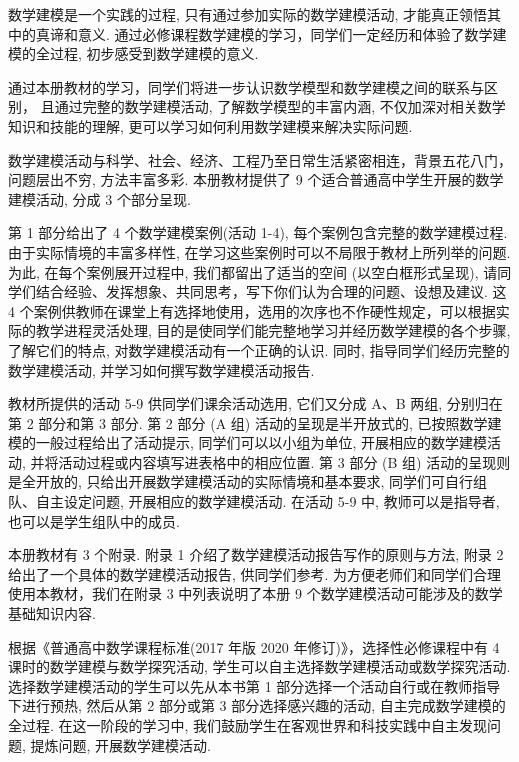 \documentclass[10pt]{article}
\begin{document}
数学建模是一个实践的过程, 只有通过参加实际的数学建模活动, 才能真正领悟其中的真谛和意义. 通过必修课程数学建模的学习，同学们一定经历和体验了数学建模的全过程, 初步感受到数学建模的意义.

通过本册教材的学习，同学们将进一步认识数学模型和数学建模之间的联系与区别， 且通过完整的数学建模活动, 了解数学模型的丰富内涵, 不仅加深对相关数学知识和技能的理解, 更可以学习如何利用数学建模来解决实际问题.

数学建模活动与科学、社会、经济、工程乃至日常生活紧密相连，背景五花八门，问题层出不穷, 方法丰富多彩. 本册教材提供了 9 个适合普通高中学生开展的数学建模活动, 分成 3 个部分呈现.

第 1 部分给出了 4 个数学建模案例(活动 1-4), 每个案例包含完整的数学建模过程. 由于实际情境的丰富多样性, 在学习这些案例时可以不局限于教材上所列举的问题. 为此, 在每个案例展开过程中, 我们都留出了适当的空间 (以空白框形式呈现), 请同学们结合经验、发挥想象、共同思考，写下你们认为合理的问题、设想及建议. 这 4 个案例供教师在课堂上有选择地使用，选用的次序也不作硬性规定，可以根据实际的教学进程灵活处理, 目的是使同学们能完整地学习并经历数学建模的各个步骤, 了解它们的特点, 对数学建模活动有一个正确的认识. 同时, 指导同学们经历完整的数学建模活动, 并学习如何撰写数学建模活动报告.

教材所提供的活动 5-9 供同学们课余活动选用, 它们又分成 A、B 两组, 分别归在第 2 部分和第 3 部分. 第 2 部分 (A 组) 活动的呈现是半开放式的, 已按照数学建模的一般过程给出了活动提示, 同学们可以以小组为单位, 开展相应的数学建模活动, 并将活动过程或内容填写进表格中的相应位置. 第 3 部分 (B 组) 活动的呈现则是全开放的, 只给出开展数学建模活动的实际情境和基本要求, 同学们可自行组队、自主设定问题, 开展相应的数学建模活动. 在活动 5-9 中, 教师可以是指导者, 也可以是学生组队中的成员.

本册教材有 3 个附录. 附录 1 介绍了数学建模活动报告写作的原则与方法, 附录 2 给出了一个具体的数学建模活动报告, 供同学们参考. 为方便老师们和同学们合理使用本教材，我们在附录 3 中列表说明了本册 9 个数学建模活动可能涉及的数学基础知识内容.

根据《普通高中数学课程标准(2017 年版 2020 年修订)》，选择性必修课程中有 4 课时的数学建模与数学探究活动, 学生可以自主选择数学建模活动或数学探究活动. 选择数学建模活动的学生可以先从本书第 1 部分选择一个活动自行或在教师指导下进行预热, 然后从第 2 部分或第 3 部分选择感兴趣的活动, 自主完成数学建模的全过程. 在这一阶段的学习中, 我们鼓励学生在客观世界和科技实践中自主发现问题, 提炼问题, 开展数学建模活动.

\section*{}
\end{document}
